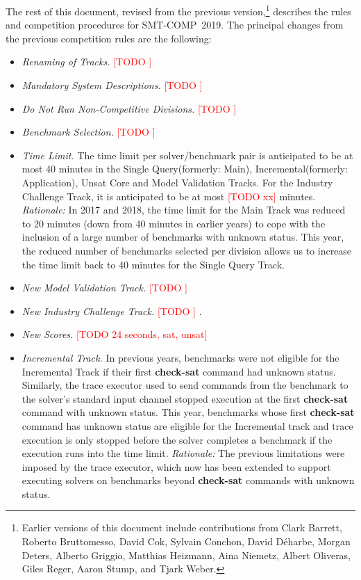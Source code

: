 \documentclass[12pt]{article}
\newcommand{\akey}[1]{\textbf{#1}}
\newcommand{\rem}[1]{\textcolor{red}{[#1]}}
\newcommand{\todo}[1]{\rem{TODO #1}}
\newcommand{\main}{Single Query\xspace}
\newcommand{\incremental}{Incremental\xspace}
\newcommand{\ucore}{Unsat Core\xspace}
\newcommand{\mval}{Model Validation\xspace}
\newcommand{\challenge}{Industry Challenge\xspace}
\begin{document}
The rest of this document, revised from the previous
version,\footnote{Earlier versions of this document include
  contributions from Clark Barrett, Roberto Bruttomesso, David Cok,
  Sylvain Conchon, David D{\'e}harbe, Morgan Deters, Alberto Griggio,
  Matthias Heizmann, Aina Niemetz, Albert Oliveras, Giles Reger, Aaron Stump,
	and Tjark Weber.}  describes the rules and competition procedures for
SMT-COMP~2019.
The principal changes from the previous competition rules are the following:
\begin{itemize}
  \item {\it Renaming of Tracks.} \todo{}

  \item {\it Mandatory System Descriptions.} \todo{}

  \item {\it Do Not Run Non-Competitive Divisions.} \todo{}

  \item {\it Benchmark Selection.} \todo{}

  \item {\it Time Limit.} The time limit per solver/benchmark pair is
    anticipated to be at most 40 minutes in the \main (formerly: Main),
    \incremental (formerly: Application), \ucore and \mval Tracks.  For the
    \challenge Track, it is anticipated to be at most \todo{xx} minutes.
    \emph{Rationale:} In 2017 and 2018, the time limit for the Main Track was
    reduced to 20 minutes (down from 40 minutes in earlier years) to cope with
    the inclusion of a large number of benchmarks with unknown status.  This
    year, the reduced number of benchmarks selected per division allows us to
    increase the time limit back to 40 minutes for the \main Track.

  \item {\it New \mval Track.} \todo{}

  \item {\it New \challenge Track.} \todo{}
.
  \item {\it New Scores.} \todo{24 seconds, sat, unsat}

  \item {\it Incremental Track.}
    In previous years, benchmarks were not eligible for the \incremental Track
    if their first \akey{check-sat} command had unknown status.  Similarly, the
    trace executor used to send commands from the benchmark to the solver's
    standard input channel stopped execution at the first \akey{check-sat}
    command with unknown status. This year, benchmarks whose first
    \akey{check-sat} command has unknown status are eligible for the
    \incremental track and trace execution is only stopped before the solver
    completes a benchmark if the execution runs into the time limit.
    \emph{Rationale:} The previous limitations were imposed by the trace
    executor, which now has been extended to support executing solvers on
    benchmarks beyond \akey{check-sat} commands with unknown status.


\end{itemize}
\end{document}
